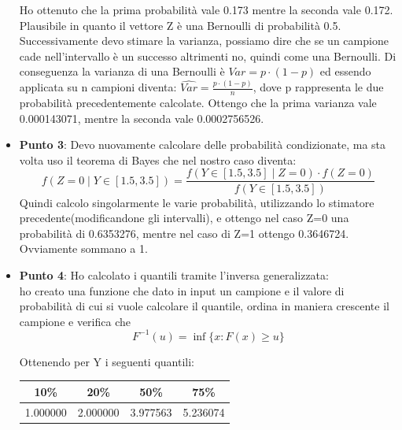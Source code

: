 \documentclass[a4paper,12pt]{article}
\begin{document}
\begin{itemize}
	Ho ottenuto che la prima probabilità vale 0.173 mentre la seconda vale 0.172. Plausibile in quanto il vettore Z è una Bernoulli di probabilità 0.5. 
	Successivamente devo stimare la varianza, possiamo dire che se un campione cade nell'intervallo è un successo altrimenti no, quindi come una Bernoulli. Di conseguenza la varianza di una Bernoulli è $Var = p \cdot(1-p)$ ed essendo applicata su n campioni diventa: $\hat{Var} =\frac{p \cdot(1-p)}{n}  $, dove p rappresenta le due probabilità precedentemente calcolate. Ottengo che la prima varianza vale 0.000143071, mentre la seconda vale 0.0002756526.
	\item \textbf{Punto 3}: Devo nuovamente calcolare delle probabilità condizionate, ma sta volta uso il teorema di Bayes che nel nostro caso diventa:\\
	\[
	f(Z = 0 \mid Y \in [1.5, 3.5])=\frac{f(Y \in [1.5, 3.5] \mid Z = 0 ) \cdot f(Z = 0)}{f(Y \in [1.5, 3.5])}
	\]
	Quindi calcolo singolarmente le varie probabilità, utilizzando lo stimatore precedente(modificandone gli intervalli), e ottengo nel caso Z=0 una probabilità di 0.6353276, mentre nel caso di Z=1 ottengo 0.3646724. Ovviamente sommano a 1.
	\item \textbf{Punto 4}: Ho calcolato i quantili tramite l'inversa generalizzata: \\
	ho creato una funzione che dato in input un campione e il valore di probabilità di cui si vuole calcolare il quantile, ordina in maniera crescente il campione e verifica che\\
	\[
	F^{-1}(u) = \inf \{ x : F(x) \geq u \}
	\]
	
	Ottenendo per Y i seguenti quantili:\\
	
	\begin{tabular}{|c|c|c|c|}
		\hline
		10\% & 20\% & 50\% & 75\% \\
		\hline
		1.000000 & 2.000000 & 3.977563 & 5.236074 \\
		\hline
	\end{tabular}\\
	

\end{itemize}
\end{document}
